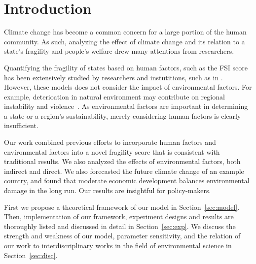 \section{Introduction}	

Climate change has become a common concern for a large portion of the human community. As such, analyzing the effect of climate change and its relation to a state's fragility and people's welfare drew many attentions from researchers.

Quantifying the fragility of states based on human factors, such as the FSI score has been extensively studied by researchers and instutitions, such as in \cite{FSI_index,EPI_index}. However, these models does not consider the impact of environmental factors. For example, deterioation in natural environment may contribute on regional instability and violence~\cite{schwartz2003abrupt,theisen2013climate,krakowka2012modeling}. As environmental factors are important in determining a state or a region's sustainability, merely considering human factors is clearly insufficient. 

Our work combined previous efforts to incorporate human factors and environmental factors into a novel fragility score that is consistent with traditional results. We also analyzed the effects of environmental factors, both indirect and direct. We also forecasted the future climate change of an example country, and found that moderate economic development balances environmental damage in the long run. Our results are insightful for policy-makers.

First we propose a theoretical framework of our model in Section~\ref{sec:model}. Then, implementation of our framework, experiment designs and results are thoroughly listed and discussed in detail in Section~\ref{sec:exp}. We discuss the strength and weakness of our model, parameter sensitivity, and the relation of our work to interdiscriplinary works in the field of environmental science in Section~\ref{sec:disc}.